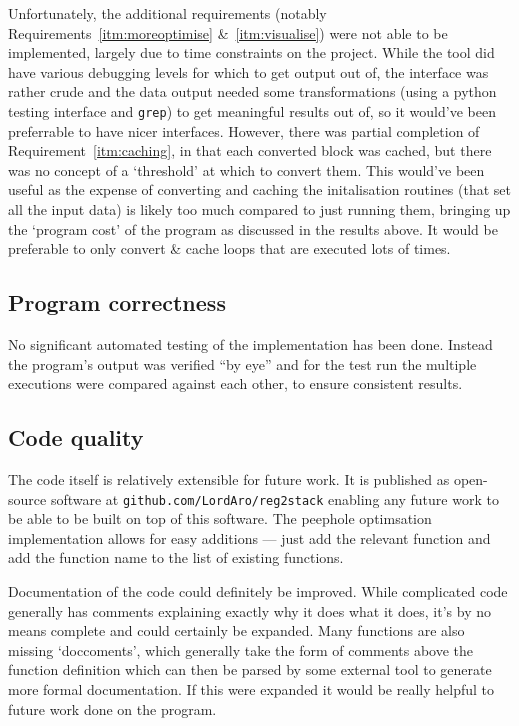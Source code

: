 Unfortunately, the additional requirements (notably
Requirements~\ref{itm:moreoptimise} \&~\ref{itm:visualise}) were not able to be
implemented, largely due to time constraints on the project. While the tool did
have various debugging levels for which to get output out of, the interface was
rather crude and the data output needed some transformations (using a python
testing interface and \texttt{grep}) to get meaningful results out of, so it
would've been preferrable to have nicer interfaces. However, there was partial
completion of Requirement~\ref{itm:caching}, in that each converted block was
cached, but there was no concept of a `threshold' at which to convert them. This
would've been useful as the expense of converting and caching the initalisation
routines (that set all the input data) is likely too much compared to just
running them, bringing up the `program cost' of the program as discussed in the
results above. It would be preferable to only convert \& cache loops that are
executed lots of times.

\subsection{Program correctness}
No significant automated testing of the implementation has been done. Instead
the program's output was verified ``by eye'' and for the test run the multiple
executions were compared against each other, to ensure consistent results.

\subsection{Code quality}
The code itself is relatively extensible for future work. It is published as
open-source software at \texttt{github.com/LordAro/reg2stack} enabling any
future work to be able to be built on top of this software. The peephole
optimsation implementation allows for easy additions --- just add the relevant
function and add the function name to the list of existing functions.

Documentation of the code could definitely be improved. While complicated code
generally has comments explaining exactly why it does what it does, it's by no
means complete and could certainly be expanded. Many functions are also missing
`doccoments', which generally take the form of comments above the function
definition which can then be parsed by some external tool to generate more
formal documentation. If this were expanded it would be really helpful to future
work done on the program.
